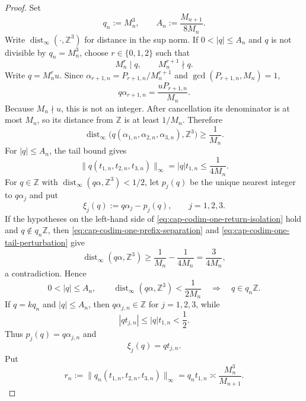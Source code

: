 \documentclass[10pt,a4paper]{amsart}
\begin{document}
\begin{proof}
Set
\begin{equation}\label{eq:cap-codim-one-qA}
  q_n:=M_n^3,
  \qquad
  A_n:=\frac{M_{n+1}}{8M_n}.
\end{equation}
Write $\operatorname{dist}_\infty(\cdot,\mathbb Z^3)$ for distance in the
sup norm.  If $0<|q|\leq A_n$ and $q$ is not divisible by $q_n=M_n^3$, choose
$r\in\{0,1,2\}$ such that
\[
  M_n^r\mid q,
  \qquad
  M_n^{r+1}\nmid q.
\]
Write $q=M_n^r u$.  Since
$\alpha_{r+1,n}=P_{r+1,n}/M_n^{r+1}$ and
$\gcd(P_{r+1,n},M_n)=1$,
\[
  q\alpha_{r+1,n}=\frac{uP_{r+1,n}}{M_n}.
\]
Because $M_n\nmid u$, this is not an integer.  After cancellation its
denominator is at most $M_n$, so its distance from $\mathbb Z$ is at least
$1/M_n$.  Therefore
\begin{equation}\label{eq:cap-codim-one-prefix-separation}
  \operatorname{dist}_\infty
  \bigl(q(\alpha_{1,n},\alpha_{2,n},\alpha_{3,n}),\mathbb Z^3\bigr)
  \geq\frac1{M_n}.
\end{equation}
For $|q|\leq A_n$, the tail bound gives
\begin{equation}\label{eq:cap-codim-one-tail-perturbation}
  \|q(t_{1,n},t_{2,n},t_{3,n})\|_\infty
  =|q|t_{1,n}
  \leq\frac1{4M_n}.
\end{equation}
For $q\in\mathbb Z$ with
$\operatorname{dist}_\infty(q\alpha,\mathbb Z^3)<1/2$, let $p_j(q)$ be the
unique nearest integer to $q\alpha_j$ and put
\begin{equation}\label{eq:cap-codim-one-return-coordinate-definition}
  \xi_j(q):=q\alpha_j-p_j(q),\qquad j=1,2,3.
\end{equation}
If the hypotheses on the left-hand side of
\eqref{eq:cap-codim-one-return-isolation} hold and $q\notin q_n\mathbb Z$,
then \eqref{eq:cap-codim-one-prefix-separation} and
\eqref{eq:cap-codim-one-tail-perturbation} give
\[
  \operatorname{dist}_\infty(q\alpha,\mathbb Z^3)
  \geq \frac1{M_n}-\frac1{4M_n}
  =\frac3{4M_n},
\]
a contradiction.  Hence
\begin{equation}\label{eq:cap-codim-one-return-isolation}
  0<|q|\leq A_n,
  \qquad
  \operatorname{dist}_\infty(q\alpha,\mathbb Z^3)<\frac1{2M_n}
  \quad\Longrightarrow\quad
  q\in q_n\mathbb Z.
\end{equation}
If $q=kq_n$ and $|q|\leq A_n$, then $q\alpha_{j,n}\in\mathbb Z$ for
$j=1,2,3$, while
\[
  |qt_{j,n}|\leq |q|t_{1,n}<\frac12.
\]
Thus $p_j(q)=q\alpha_{j,n}$ and
\begin{equation}\label{eq:cap-codim-one-special-return}
  \xi_j(q)=qt_{j,n}.
\end{equation}
Put
\begin{equation}\label{eq:cap-codim-one-rn}
  r_n:=\|q_n(t_{1,n},t_{2,n},t_{3,n})\|_\infty
  =q_nt_{1,n}
  \asymp\frac{M_n^3}{M_{n+1}}.
\end{equation}


\end{proof}
\end{document}
